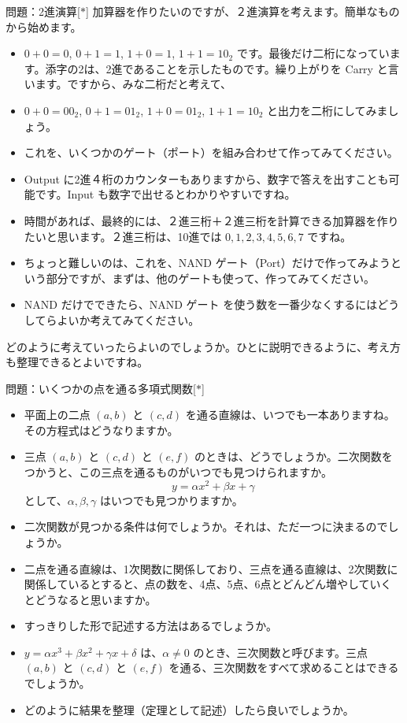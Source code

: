 \documentclass[10pt, dvipdfmx]{beamer}
\begin{document}
\begin{frame}{問題：2進演算\hfill [$\ast$]}
加算器を作りたいのですが、２進演算を考えます。簡単なものから始めます。

\begin{itemize}
\item $0+0=0$, $0+1=1$, $1+0=1$, $1+1 = 10_2$ です。最後だけ二桁になっています。添字の2は、2進であることを示したものです。繰り上がりを Carry と言います。ですから、みな二桁だと考えて、
\item $0+0=00_2$, $0+1=01_2$, $1+0=01_2$, $1+1 = 10_2$
と出力を二桁にしてみましょう。
\item これを、いくつかのゲート（ポート）を組み合わせて作ってみてください。
\item Output に2進４桁のカウンターもありますから、数字で答えを出すことも可能です。Input も数字で出せるとわかりやすいですね。
\item 時間があれば、最終的には、２進三桁＋２進三桁を計算できる加算器を作りたいと思います。２進三桁は、10進では $0, 1, 2, 3, 4, 5, 6, 7$ ですね。
\item ちょっと難しいのは、これを、NAND ゲート（Port）だけで作ってみようという部分ですが、まずは、他のゲートも使って、作ってみてください。
\item NAND だけでできたら、NAND ゲート を使う数を一番少なくするにはどうしてらよいか考えてみてください。
\end{itemize}
どのように考えていったらよいのでしょうか。ひとに説明できるように、考え方も整理できるとよいですね。
\end{frame}
\begin{frame}{問題：いくつかの点を通る多項式関数\hfill [$\ast$]}
\begin{itemize}
\item 平面上の二点 $(a,b)$ と $(c,d)$ を通る直線は、いつでも一本ありますね。その方程式はどうなりますか。
\item 三点 $(a,b)$ と $(c,d)$ と $(e,f)$ のときは、どうでしょうか。二次関数をつかうと、この三点を通るものがいつでも見つけられますか。
\[
y = \alpha x^2 + \beta x + \gamma
\]
として、$\alpha, \beta, \gamma$ はいつでも見つかりますか。
\item 二次関数が見つかる条件は何でしょうか。それは、ただ一つに決まるのでしょうか。
\item 二点を通る直線は、1次関数に関係しており、三点を通る直線は、2次関数に関係しているとすると、点の数を、4点、5点、6点とどんどん増やしていくとどうなると思いますか。
\item すっきりした形で記述する方法はあるでしょうか。
\item $y = \alpha x^3 + \beta x^2 + \gamma x + \delta$ は、$\alpha \neq 0$ のとき、三次関数と呼びます。三点 $(a,b)$ と $(c,d)$ と $(e,f)$ を通る、三次関数をすべて求めることはできるでしょうか。
\item どのように結果を整理（定理として記述）したら良いでしょうか。
\end{itemize}
\end{frame}
\end{document}
